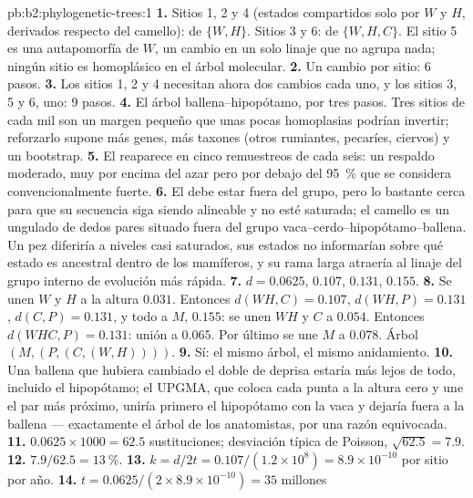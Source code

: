 \begin{solution}{pb:b2:phylogenetic-trees:1}
\textbf{1.} Sitios 1, 2 y 4 (estados compartidos solo por $W$ y $H$,
derivados respecto del camello):  de $\{W,H\}$. Sitios 3
y 6:  de $\{W,H,C\}$. El sitio 5 es una autapomorfía de
$W$, un cambio en un solo linaje que no agrupa nada; ningún sitio es
homoplásico en el árbol molecular.
\textbf{2.} Un cambio por sitio: 6 pasos.
\textbf{3.} Los sitios 1, 2 y 4 necesitan ahora dos cambios cada uno, y los
sitios 3, 5 y 6, uno: 9 pasos.
\textbf{4.} El árbol ballena--hipopótamo, por tres pasos. Tres sitios de
cada mil son un margen pequeño que unas pocas homoplasias podrían
invertir; reforzarlo supone más genes, más taxones (otros rumiantes,
pecaríes, ciervos) y un bootstrap.
\textbf{5.} El  reaparece en cinco remuestreos de cada seis: un
respaldo moderado, muy por encima del azar pero por debajo del
\qty{95}{\%} que se considera convencionalmente fuerte.
\textbf{6.} El  debe estar fuera del grupo, pero lo bastante
cerca para que su secuencia siga siendo alineable y no esté saturada; el
camello es un ungulado de dedos pares situado fuera del grupo
vaca--cerdo--hipopótamo--ballena. Un pez diferiría a niveles casi saturados,
sus estados no informarían sobre qué estado es ancestral dentro de los
mamíferos, y su rama larga atraería al linaje del grupo interno de
evolución más rápida.
\textbf{7.} $d = 0.0625$, $0.107$, $0.131$, $0.155$.
\textbf{8.} Se unen $W$ y $H$ a la altura $0.031$. Entonces $d(WH,C) =
0.107$, $d(WH,P) = 0.131$, $d(C,P) = 0.131$, y todo a $M$,
$0.155$: se unen $WH$ y $C$ a $0.054$. Entonces $d(WHC,P) = 0.131$: unión
a $0.065$. Por último se une $M$ a $0.078$. Árbol $(M,(P,(C,(W,H))))$.
\textbf{9.} Sí: el mismo árbol, el mismo anidamiento.
\textbf{10.} Una ballena que hubiera cambiado el doble de deprisa estaría
más lejos de todo, incluido el hipopótamo; el UPGMA, que coloca cada punta
a la altura cero y une el par más próximo, uniría primero el hipopótamo
con la vaca y dejaría fuera a la ballena --- exactamente el árbol de los
anatomistas, por una razón equivocada.
\textbf{11.} $0.0625\times 1000 = 62.5$ sustituciones; desviación típica
de Poisson, $\sqrt{62.5} = 7.9$.
\textbf{12.} $7.9/62.5 = \qty{13}{\%}$.
\textbf{13.} $k = d/2t = 0.107/(1.2\times 10^{8}) = 8.9\times 10^{-10}$
por sitio por año.
\textbf{14.} $t = 0.0625/(2\times 8.9\times 10^{-10}) = 35$ millones

\end{solution}
